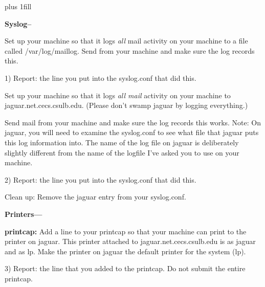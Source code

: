 
\rightskip=0pt plus 1fill

\parindent 0pt

{\bf Syslog--}

Set up your machine so that it logs {\it  all} mail activity 
on your machine to a file
called {\ltt{}/var/log/maillog}.
Send from your machine and make sure the log records this.

1) Report: the line you put into the syslog.conf that did this.

Set up your machine so that it logs {\it all mail} activity 
on your machine to 
{\ltt{}jaguar.net.cecs.csulb.edu}.
(Please don't swamp jaguar by logging everything.)

Send mail from your machine and make sure the log records this works.
Note: On {\ltt{}jaguar}, you will need to examine the {\ltt{}syslog.conf}
to see what file that {\ltt{}jaguar} puts this log information into.
The name of the log file on jaguar is deliberately slightly different from
the name of the logfile I've asked you to use on your machine.

2) Report: the line you put into the syslog.conf that did this.

Clean up: Remove the {\ltt{}jaguar} entry from your {\ltt{}syslog.conf}.


{\bf Printers---}

{\bf printcap:}
Add a line to your printcap so that your machine can
print to the printer on jaguar.
This printer attached to {\ltt{}jaguar.net.cecs.csulb.edu} is
as {\ltt{}jaguar} and as {\ltt{}lp}.
Make the printer on {\ltt{}jaguar} the default printer for the system 
({\ltt{}lp}).

3) Report: the line that you added to the printcap. 
Do not submit the entire printcap.

\bye
